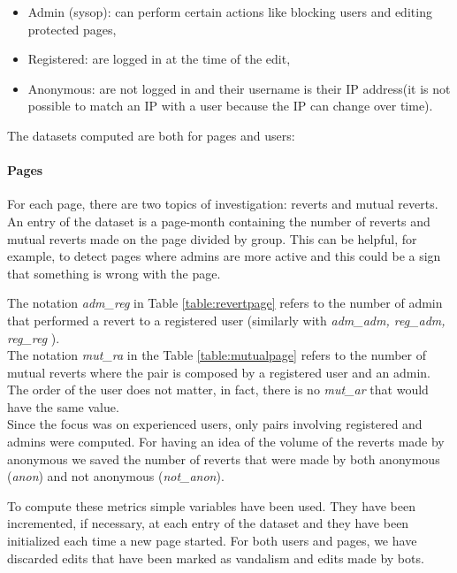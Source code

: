 \begin{itemize}
    \item Admin (sysop): can perform certain actions like blocking users and editing protected pages, 
    \item Registered: are logged in at the time of the edit, 
    \item Anonymous: are not logged in and their username is their IP address(it is not possible to match an IP with a user
        because the IP can change over time).
\end{itemize}

The datasets computed are both for pages and users: 
\paragraph*{Pages} 
For each page, there are two topics of investigation: reverts and mutual reverts. An entry of the
dataset is a page-month containing the number of reverts and mutual reverts made on the page
divided by group. This can be helpful, for example, to detect pages where admins are more active and
this could be a sign that something is wrong with the page.



The notation \textit{adm\_reg} in Table \ref{table:revertpage} refers to the number of admin that performed a
revert to a registered user (similarly with \textit{adm\_adm, reg\_adm, reg\_reg} ).\\

The notation \textit{mut\_ra} in the Table \ref{table:mutualpage} refers to the number of mutual
reverts where the pair is composed by a registered user and an admin. The order of the user does not
matter, in fact, there is no \textit{mut\_ar} that would have the same value.\\


Since the focus was on experienced users, only pairs involving registered and admins were computed.
For having an idea of the volume of the reverts made by anonymous we saved the number of reverts
that were made by both anonymous (\textit{anon}) and not anonymous (\textit{not\_anon}).

To compute these metrics simple variables have been used. They have been incremented, if
necessary, at each entry of the dataset and they have been initialized each time a new page 
started. For both users and pages, we have discarded edits that have been marked as vandalism and
edits made by bots.

